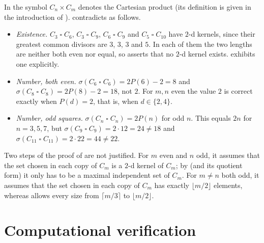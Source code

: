 \documentclass[11pt]{article}
\theoremstyle{plain}
\theoremstyle{definition}
\theoremstyle{remark}
\newcommand{\T}{\mathbin{\square}}
\newcommand{\Per}{P}
\begin{document}
In \cite{BW2016} the symbol $C_n \times C_m$ denotes the Cartesian product (its definition is
given in the introduction of \cite{BW2016}).  contradicts
\cite[Theorem~2.5 and Corollary~2.6]{BW2016} as follows.
\begin{itemize}
  \item \emph{Existence.} $C_3 \T C_6$, $C_3 \T C_9$, $C_6 \T C_9$ and $C_5 \T C_{10}$ have
        $2$-d kernels, since their greatest common divisors are $3$, $3$, $3$ and $5$. In each
        of them the two lengths are neither both even nor equal, so \cite[Theorem~2.5]{BW2016}
        asserts that no $2$-d kernel exists.  exhibits one explicitly.
  \item \emph{Number, both even.} $\sigma(C_6 \T C_6) = 2\Per(6) - 2 = 8$ and
        $\sigma(C_8 \T C_8) = 2\Per(8) - 2 = 18$, not $2$. For $m, n$ even the value $2$ is
        correct exactly when $\Per(d) = 2$, that is, when $d \in \{2, 4\}$.
  \item \emph{Number, odd squares.} $\sigma(C_n \T C_n) = 2\Per(n)$ for odd $n$. This equals
        $2n$ for $n = 3, 5, 7$, but $\sigma(C_9 \T C_9) = 2 \cdot 12 = 24 \ne 18$ and
        $\sigma(C_{11} \T C_{11}) = 2 \cdot 22 = 44 \ne 22$.
\end{itemize}
Two steps of the proof of \cite[Theorem~2.5]{BW2016} are not justified. For $m$ even and $n$
odd, it assumes that the set chosen in each copy of $C_m$ is a $2$-d kernel of $C_m$; by
 (and its quotient form) it only has to be a maximal independent set of $C_m$.
For $m \ne n$ both odd, it assumes that the set chosen in each copy of $C_m$ has exactly
$\lfloor m/2 \rfloor$ elements, whereas  allows every size from
$\lceil m/3 \rceil$ to $\lfloor m/2 \rfloor$.

\section{Computational verification}\label{sec:verification}
\end{document}

